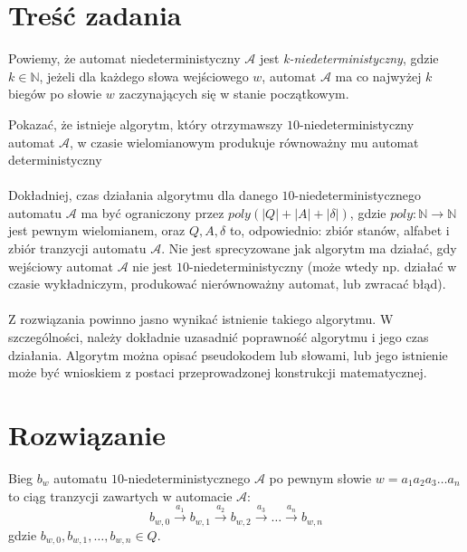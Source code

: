 \documentclass[12pt]{article}
\newcommand*{\Autom}{\mathcal{A}}
\begin{document}
\maketitle

\section{Treść zadania}
Powiemy, że automat niedeterministyczny $\Autom$ jest \textit{k-niedeterministyczny}, gdzie
$k \in \mathbb{N}$, jeżeli dla każdego słowa wejściowego $w$, automat $\Autom$ ma co najwyżej
$k$ biegów po słowie $w$ zaczynających się w stanie początkowym.

Pokazać, że istnieje algorytm, który otrzymawszy $10$-niedeterministyczny automat $\Autom$,
w czasie wielomianowym produkuje równoważny mu automat deterministyczny

\paragraph{}
Dokładniej, czas działania algorytmu dla danego $10$-niedeterministycznego automatu $\Autom$
ma być ograniczony przez $poly(|Q|+|A|+|\delta|)$, gdzie ${poly:\mathbb{N}\rightarrow\mathbb{N}}$
jest pewnym wielomianem, oraz $Q,A,\delta$ to, odpowiednio: zbiór stanów, alfabet i zbiór
tranzycji automatu $\Autom$. Nie jest sprecyzowane jak algorytm ma działać, gdy wejściowy
automat $\Autom$ nie jest $10$-niedeterministyczny (może wtedy np. działać w czasie
wykładniczym, produkować nierównoważny automat, lub zwracać błąd).

\paragraph{}
Z rozwiązania powinno jasno wynikać istnienie takiego algorytmu. W szczególności, należy dokładnie
uzasadnić poprawność algorytmu i jego czas działania. Algorytm można opisać pseudokodem lub
słowami, lub jego istnienie może być wnioskiem z postaci przeprowadzonej konstrukcji matematycznej.

\clearpage

\section{Rozwiązanie}
Bieg $b_w$ automatu $10$-niedeterministycznego $\Autom$ po pewnym słowie
$w = a_1 a_2 a_3 \dots a_n$ to ciąg tranzycji zawartych w automacie $\Autom$:
$$b_{w,0} \xrightarrow{a_1} b_{w,1} \xrightarrow{a_2} b_{w,2} \xrightarrow{a_3}
\dots \xrightarrow{a_n} b_{w,n}$$
gdzie $b_{w,0}, b_{w,1}, \dots, b_{w,n} \in Q$.
\end{document}
